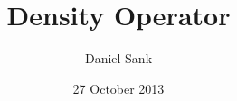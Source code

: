 \documentclass{article}
\begin{document}
\title{Density Operator}
\author{Daniel Sank}
\date{27 October 2013}
\maketitle

\end{document}
